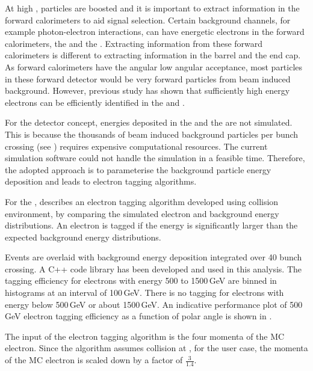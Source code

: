 At high \sqrtS, particles are boosted and it is important to extract information in the forward calorimeters to aid signal selection. Certain background channels, for example photon-electron interactions, can have energetic electrons in  the forward calorimeters, the \LumiCAL and the \BeamCAL. Extracting information from these forward calorimeters is different to extracting information in the barrel and the end cap. As forward calorimeters have the angular low angular acceptance, most particles in these forward detector would be very forward particles from beam induced background. However, previous study \cite{sailer2012radiation} has shown that sufficiently high energy electrons can be efficiently identified in the \BeamCAL and \LumiCAL.

For the \CLICILD detector concept, energies deposited in the \LumiCAL and the \BeamCAL are not simulated. This is because the thousands of beam induced background particles per bunch crossing (see \Section{}) requires expensive computational resources. The current simulation software could not handle the simulation in a feasible time. Therefore, the adopted approach is to parameterise the background particle energy deposition and leads to electron tagging algorithms.

For the \BeamCAL, \cite{Sailer:2017onh} describes an electron tagging algorithm developed using  collision environment, by comparing the simulated electron and background energy distributions. An electron is tagged if the energy is significantly larger than the expected background energy distributions.

Events are overlaid with background energy deposition integrated over 40 bunch crossing. A C++ code library has been developed and used in this analysis. The tagging efficiency for electrons with energy 500 to 1500\,GeV are binned in histograms at an interval of 100\,GeV. There is no tagging for electrons with energy below 500\,GeV or about 1500\,GeV. An indicative performance plot of 500\,GeV electron tagging efficiency as a function of polar angle is shown in .

The input of the \BeamCAL electron tagging algorithm is the four momenta of the MC electron. Since the algorithm assumes collision at , for the  user case, the momenta of the MC electron is scaled down by a factor of $\frac{3}{1.4}$.

